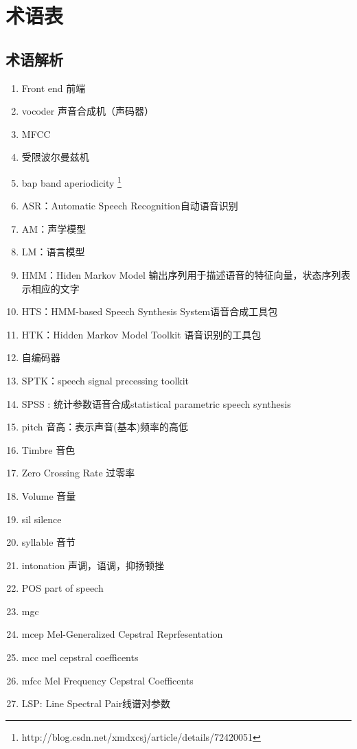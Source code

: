 \chapter{术语表}

\section{术语解析}
\begin{enumerate}
    \item Front end 前端  
    \item vocoder 声音合成机（声码器）  
    \item MFCC 
    \item 受限波尔曼兹机  
    \item bap band aperiodicity \footnote{http://blog.csdn.net/xmdxcsj/article/details/72420051}
    \item ASR：Automatic Speech Recognition自动语音识别  
    \item AM：声学模型  
    \item LM：语言模型  
    \item HMM：Hiden Markov Model 输出序列用于描述语音的特征向量，状态序列表示相应的文字  
    \item HTS：HMM-based Speech Synthesis System语音合成工具包  
    \item HTK：Hidden Markov Model Toolkit 语音识别的工具包  
    \item 自编码器  
    \item SPTK：speech signal precessing toolkit  
    \item SPSS : 统计参数语音合成statistical parametric speech synthesis  
    \item pitch 音高：表示声音(基本)频率的高低
    \item Timbre 音色
    \item Zero Crossing Rate 过零率
    \item Volume 音量
    \item sil silence
    \item syllable 音节
    \item intonation 声调，语调，抑扬顿挫
    \item POS part of speech
    \item mgc 
    \item mcep Mel-Generalized Cepstral Reprfesentation
    \item mcc mel cepstral coefficents
    \item mfcc Mel Frequency Cepstral Coefficents
    \item LSP: Line Spectral Pair线谱对参数

\end{enumerate}
